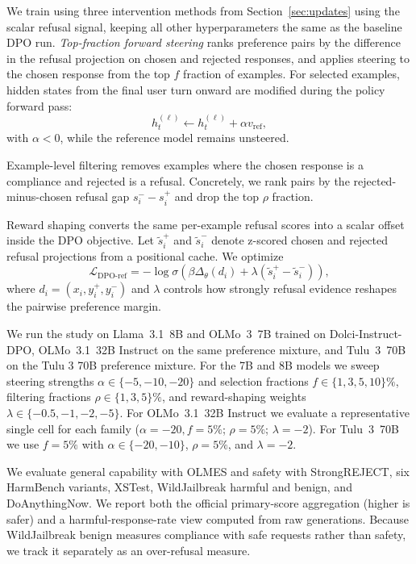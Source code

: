 \documentclass{article} %
\begin{document}
We train using three intervention methods from Section~\ref{sec:updates} using the scalar refusal signal, keeping all other hyperparameters the same as the baseline DPO run.
\emph{Top-fraction forward steering} ranks preference pairs by the difference in the refusal projection on chosen and rejected responses, and applies steering to the chosen response from the top $f$ fraction of examples. For selected examples, hidden states from the final user turn onward are modified during the policy forward pass:
\[
h_t^{(\ell)} \leftarrow h_t^{(\ell)} + \alpha v_{\mathrm{ref}},
\]
with $\alpha < 0$, while the reference model remains unsteered. 

Example-level filtering removes examples where the chosen response is a compliance and rejected is a refusal. Concretely, we rank pairs by the rejected-minus-chosen refusal gap $s_i^- - s_i^+$ and drop the top $\rho$ fraction.

Reward shaping converts the same per-example refusal scores into a scalar offset inside the DPO objective. Let $\tilde{s}_i^+$ and $\tilde{s}_i^-$ denote z-scored chosen and rejected refusal projections from a positional cache. We optimize
\[
\mathcal{L}_{\mathrm{DPO\text{-}ref}} =
-\log \sigma\!\left(
\beta \Delta_\theta(d_i) + \lambda(\tilde{s}_i^+ - \tilde{s}_i^-)
\right),
\]
where $d_i=(x_i,y_i^+,y_i^-)$ and $\lambda$ controls how strongly refusal evidence reshapes the pairwise preference margin.

We run the study on Llama~3.1~8B and OLMo~3~7B trained on Dolci-Instruct-DPO, OLMo~3.1~32B Instruct on the same preference mixture, and Tulu~3~70B on the Tulu 3 70B preference mixture. For the 7B and 8B models we sweep steering strengths $\alpha \in \{-5,-10,-20\}$ and selection fractions $f \in \{1,3,5,10\}\%$, filtering fractions $\rho \in \{1,3,5\}\%$, and reward-shaping weights $\lambda \in \{-0.5,-1,-2,-5\}$. For OLMo~3.1~32B Instruct we evaluate a representative single cell for each family ($\alpha=-20,f=5\%$; $\rho=5\%$; $\lambda=-2$). For Tulu~3~70B we use $f=5\%$ with $\alpha \in \{-20,-10\}$, $\rho=5\%$, and $\lambda=-2$.

We evaluate general capability with OLMES and safety with StrongREJECT, six HarmBench variants, XSTest, WildJailbreak harmful and benign, and DoAnythingNow. We report both the official primary-score aggregation (higher is safer) and a harmful-response-rate view computed from raw generations. Because WildJailbreak benign measures compliance with safe requests rather than safety, we track it separately as an over-refusal measure.
\end{document}
